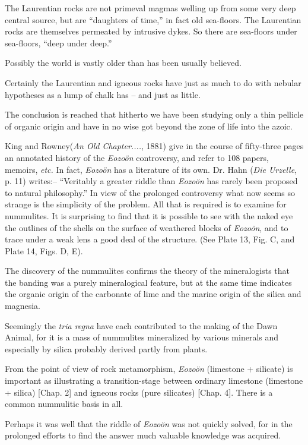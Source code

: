 \documentclass[a4paper, 12pt, oneside]{article}
\begin{document}
The Laurentian rocks are not primeval magmas welling up from some very deep central source, but are ``daughters of time,'' in fact old sea-floors. The Laurentian rocks are themselves permeated by intrusive dykes. So there are sea-floors under sea-floors, ``deep under deep.''

Possibly the world is vastly older than has been usually believed.

Certainly the Laurentian and igneous rocks have just as much to do with nebular hypotheses as a lump of chalk has -- and just as little.

The conclusion is reached that hitherto we have been studying only a thin pellicle of organic origin and have in no wise got beyond the zone of life into the azoic.

King and Rowney(\emph{An Old Chapter....}, 1881) give in the course of fifty-three pages an annotated history of the \emph{Eozoön} controversy, and refer to 108 papers, memoirs, \emph{etc.} In fact, \emph{Eozoön} has a literature of its own. Dr. Hahn (\emph{Die Urzelle}, p. 11) writes:-- ``Veritably a greater riddle than \emph{Eozoön} has rarely been proposed to natural philosophy.'' In view of the prolonged controversy what now seems so strange is the simplicity of the problem. All that is required is to examine for nummulites. It is surprising to find that it is possible to see with the naked eye the outlines of the shells on the surface of weathered blocks of \emph{Eozoön}, and to trace under a weak lens a good deal of the structure. (See Plate 13, Fig. C, and Plate 14, Figs. D, E).

The discovery of the nummulites confirms the theory of the mineralogists that the banding was a purely mineralogical feature, but at the same time indicates the organic origin of the carbonate of lime and the marine origin of the silica and magnesia.

Seemingly the \emph{tria regna} have each contributed to the making of the Dawn Animal, for it is a mass of nummulites mineralized by various minerals and especially by silica probably derived partly from plants.

From the point of view of rock metamorphism, \emph{Eozoön} (limestone + silicate) is important as illustrating a transition-stage between ordinary limestone (limestone + silica) [Chap. 2] and igneous rocks (pure silicates) [Chap. 4]. There is a common nummulitic basis in all.

Perhaps it was well that the riddle of \emph{Eozoön} was not quickly solved, for in the prolonged efforts to find the answer much valuable knowledge was acquired.
\end{document}
